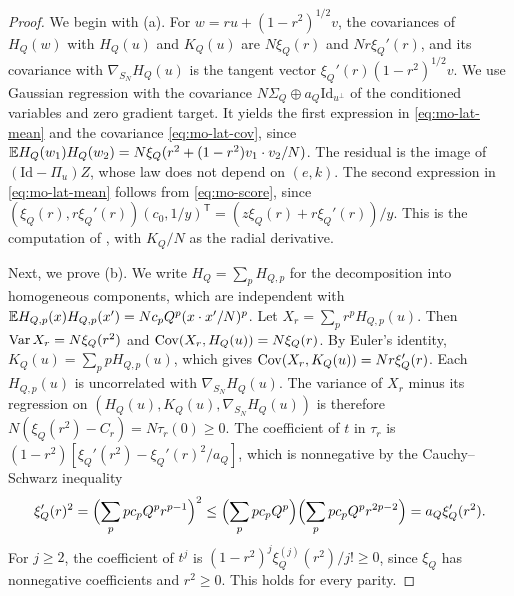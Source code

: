 \begin{proof}
We begin with (a). For $w=ru+(1-r^2)^{1/2}v$, the covariances of $H_Q(w)$ with $H_Q(u)$ and $K_Q(u)$ are $N\xi_Q(r)$ and $Nr\xi_Q'(r)$, and its covariance with $\nabla_{S_N}H_Q(u)$ is the tangent vector $\xi_Q'(r)(1-r^2)^{1/2}v$. We use Gaussian regression with the covariance $N\Sigma_Q\oplus a_Q\mathrm{Id}_{u^\perp}$ of the conditioned variables and zero gradient target. It yields the first expression in \eqref{eq:mo-lat-mean} and the covariance \eqref{eq:mo-lat-cov}, since $\mathbb E H_Q(w_1)H_Q(w_2)=N\xi_Q(r^2+(1-r^2)v_1\cdot v_2/N)$. The residual is the image of $(\mathrm{Id}-\Pi_u)Z$, whose law does not depend on $(e,k)$. The second expression in \eqref{eq:mo-lat-mean} follows from \eqref{eq:mo-score}, since $(\xi_Q(r),r\xi_Q'(r))(c_0,1/y)^{\mathsf T}=(z\xi_Q(r)+r\xi_Q'(r))/y$. This is the computation of \cite[Lemma~3.11]{HuangSellke2024}, with $K_Q/N$ as the radial derivative.

Next, we prove (b). We write $H_Q=\sum_pH_{Q,p}$ for the decomposition into homogeneous components, which are independent with $\mathbb E H_{Q,p}(x)H_{Q,p}(x')=Nc_pQ^p(x\cdot x'/N)^p$. Let $X_r=\sum_pr^pH_{Q,p}(u)$. Then $\operatorname{Var} X_r=N\xi_Q(r^2)$ and $\operatorname{Cov}(X_r,H_Q(u))=N\xi_Q(r)$. By Euler's identity, $K_Q(u)=\sum_ppH_{Q,p}(u)$, which gives $\operatorname{Cov}(X_r,K_Q(u))=Nr\xi_Q'(r)$. Each $H_{Q,p}(u)$ is uncorrelated with $\nabla_{S_N}H_Q(u)$. The variance of $X_r$ minus its regression on $(H_Q(u),K_Q(u),\nabla_{S_N}H_Q(u))$ is therefore $N(\xi_Q(r^2)-C_r)=N\tau_r(0)\ge0$. The coefficient of $t$ in $\tau_r$ is $(1-r^2)[\xi_Q'(r^2)-\xi_Q'(r)^2/a_Q]$, which is nonnegative by the Cauchy--Schwarz inequality
\[
\xi_Q'(r)^2=\Bigl(\sum_ppc_pQ^pr^{p-1}\Bigr)^2\le\Bigl(\sum_ppc_pQ^p\Bigr)\Bigl(\sum_ppc_pQ^pr^{2p-2}\Bigr)=a_Q\xi_Q'(r^2).
\]
For $j\ge2$, the coefficient of $t^j$ is $(1-r^2)^j\xi_Q^{(j)}(r^2)/j!\ge0$, since $\xi_Q$ has nonnegative coefficients and $r^2\ge0$. This holds for every parity.


\end{proof}
